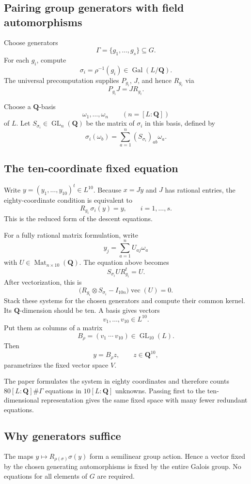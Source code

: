 \documentclass[11pt]{article}
\newcommand{\QQ}{\mathbf{Q}}
\newcommand{\Gal}{\operatorname{Gal}}
\newcommand{\Mat}{\operatorname{Mat}}
\begin{document}
\subsection{Pairing group generators with field automorphisms}

Choose generators
\[
  \Gamma=\{g_1,\ldots,g_s\}\subseteq G.
\]
For each $g_i$, compute
\[
  \sigma_i=\rho^{-1}(g_i)\in\Gal(L/\QQ).
\]
The universal precomputation supplies $P_{g_i}$, $J$, and hence $R_{g_i}$ via
\[
  P_{g_i}J=JR_{g_i}.
\]

Choose a $\QQ$-basis
\[
  \omega_1,\ldots,\omega_n
  \qquad(n=[L:\QQ])
\]
of $L$.  Let $S_{\sigma_i}\in\operatorname{GL}_n(\QQ)$ be the matrix of
$\sigma_i$ in this basis, defined by
\[
  \sigma_i(\omega_b)=\sum_{a=1}^{n}(S_{\sigma_i})_{ab}\omega_a.
\]

\subsection{The ten-coordinate fixed equation}

Write $y=(y_1,\ldots,y_{10})^t\in L^{10}$.  Because $x=Jy$ and $J$ has rational
entries, the eighty-coordinate condition is equivalent to
\[
  R_{g_i}\,\sigma_i(y)=y,
  \qquad i=1,\ldots,s.
\]
This is the reduced form of the descent equations.

For a fully rational matrix formulation, write
\[
  y_j=\sum_{a=1}^{n}U_{aj}\omega_a
\]
with $U\in\Mat_{n\times10}(\QQ)$.  The equation above becomes
\[
  S_{\sigma_i}UR_{g_i}^{t}=U.
\]
After vectorization, this is
\[
  \bigl(R_{g_i}\otimes S_{\sigma_i}-I_{10n}\bigr)\operatorname{vec}(U)=0.
\]
Stack these systems for the chosen generators and compute their common
kernel.  Its $\QQ$-dimension should be ten.  A basis gives vectors
\[
  v_1,\ldots,v_{10}\in L^{10}.
\]
Put them as columns of a matrix
\[
  B_{\rho}=(v_1\ \cdots\ v_{10})\in\operatorname{GL}_{10}(L).
\]
Then
\[
  y=B_{\rho}z,
  \qquad z\in\QQ^{10},
\]
parametrizes the fixed vector space $V$.

The paper formulates the system in eighty coordinates and therefore counts
$80[L:\QQ]\#\Gamma$ equations in $10[L:\QQ]$ unknowns.  Passing first to the
ten-dimensional representation gives the same fixed space with many fewer
redundant equations.

\subsection{Why generators suffice}

The maps $y\mapsto R_{\rho(\sigma)}\sigma(y)$ form a semilinear group action.
Hence a vector fixed by the chosen generating automorphisms is fixed by the
entire Galois group.  No equations for all elements of $G$ are required.
\end{document}
